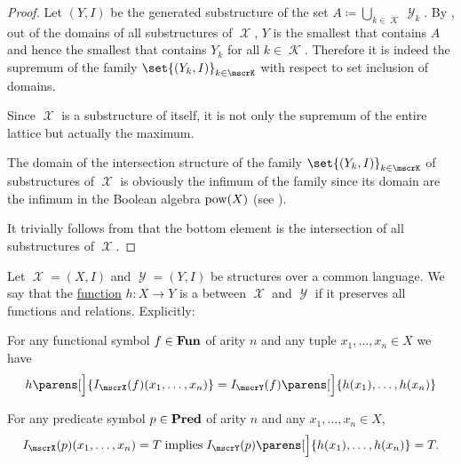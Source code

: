 \begin{proof}
   Let \( (Y, I) \) be the generated substructure of the set \( A \coloneqq \bigcup_{k \in \mscrK} \mscrY_k \). By , out of the domains of all substructures of \( \mscrX \), \( Y \) is the smallest that contains \( A \) and hence the smallest that contains \( Y_k \) for all \( k \in \mscrK \). Therefore it is indeed the supremum of the family \( \set{ (Y_k, I) }_{k \in \mscrK} \) with respect to set inclusion of domains.

   Since \( \mscrX \) is a substructure of itself, it is not only the supremum of the entire lattice but actually the maximum.

   The domain of the intersection structure of the family \( \set{ (Y_k, I) }_{k \in \mscrK} \) of substructures of \( \mscrX \) is obviously the infimum of the family since its domain are the infimum in the Boolean algebra \( \operatorname{pow}(X) \) (see ).

   It trivially follows from  that the bottom element is the intersection of all substructures of \( \mscrX \).
\end{proof}

\begin{definition}\label{def:first_order_homomorphism}
  Let \( \mscrX = (X, I) \) and \( \mscrY = (Y, I) \) be structures over a common language. We say that the \hyperref[def:function]{function} \( h: X \to Y \) is a  between \( \mscrX \) and \( \mscrY \) if it preserves all functions and relations. Explicitly:
  \begin{thmenum}
     For any functional symbol \( f \in \operatorname{\mathbf{Fun}} \) of arity \( n \) and any tuple \( x_1, \ldots, x_n \in X \) we have
    \begin{equation*}
      h\parens[\Big]{ I_\mscrX(f)(x_1, \ldots, x_n) } = I_\mscrY(f) \parens[\Big]{ h(x_1), \ldots, h(x_n) }
    \end{equation*}

     For any predicate symbol \( p \in \operatorname{\mathbf{Pred}} \) of arity \( n \) and any \( x_1, \ldots, x_n \in X \),
    \begin{equation*}
      I_\mscrX(p) (x_1, \ldots, x_n) = T \T{implies} I_\mscrY(p) \parens[\Big]{ h(x_1), \ldots, h(x_n) } = T.
    \end{equation*}
  \end{thmenum}
\end{definition}

